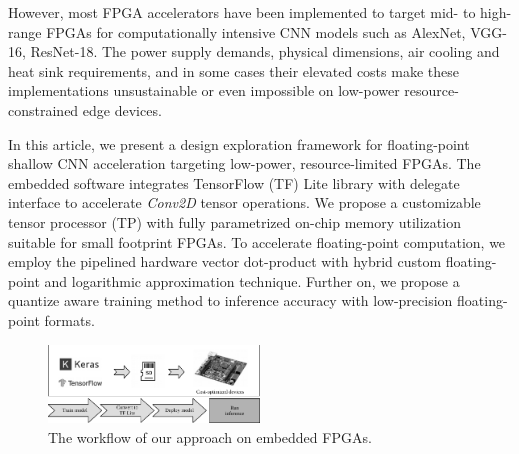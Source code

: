 However, most FPGA accelerators have been implemented to target mid- to high-range FPGAs for computationally intensive CNN models such as AlexNet, VGG-16, ResNet-18. The power supply demands, physical dimensions, air cooling and heat sink requirements, and in some cases their elevated costs make these implementations unsustainable or even impossible  on low-power resource-constrained edge devices.


In this article, we present a design exploration framework for floating-point shallow CNN acceleration targeting low-power, resource-limited FPGAs. The embedded software integrates TensorFlow (TF) Lite library with delegate interface to accelerate \emph{Conv2D} tensor operations. We propose a customizable tensor processor (TP) with fully parametrized on-chip memory utilization suitable for small footprint FPGAs. To accelerate floating-point computation, we employ the pipelined hardware vector dot-product with hybrid custom floating-point and logarithmic approximation technique\cite{nevarez2021accelerating}. Further on, we propose a quantize aware training method to  inference accuracy with low-precision floating-point formats.

\begin{figure}[t!]
	\centering
	\includegraphics[width=0.5\textwidth]{../figures/workflow.pdf}
	\caption{The workflow of our approach on embedded FPGAs.}
	\label{fig:workflow}
\end{figure}

